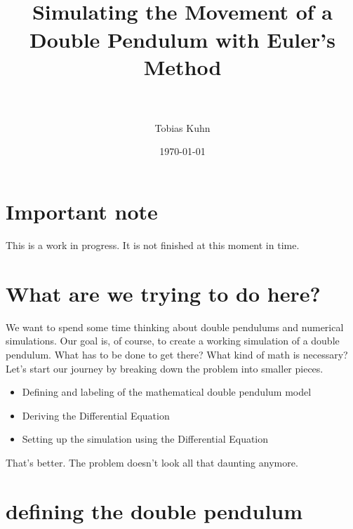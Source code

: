 \documentclass[paper=a4, fontsize=11pt]{scrartcl} %
\title{
\normalfont \normalsize 
\horrule{0.5pt} \\[0.4cm] %
\huge Simulating the Movement of a Double Pendulum with Euler's Method \\ %
\horrule{2pt} \\[0.5cm] %
}
\author{Tobias Kuhn} %
\date{\normalsize\today} %
\numberwithin{equation}{section} %
\numberwithin{figure}{section} %
\numberwithin{table}{section} %
\begin{document}
\maketitle %

\section{Important note}
This is a work in progress. It is not finished at this moment in time.

\section{What are we trying to do here?}
We want to spend some time thinking about double pendulums and numerical simulations.
Our goal is, of course, to create a working simulation of a double pendulum. 
What has to be done to get there? What kind of math is necessary?
Let's start our journey by breaking down the problem into smaller pieces.
\begin{itemize}
  \item Defining and labeling of the mathematical double pendulum model 
  \item Deriving the Differential Equation
  \item Setting up the simulation using the Differential Equation
\end{itemize}
That's better. The problem doesn't look all that daunting anymore.

\section{defining the double pendulum}
\end{document}
